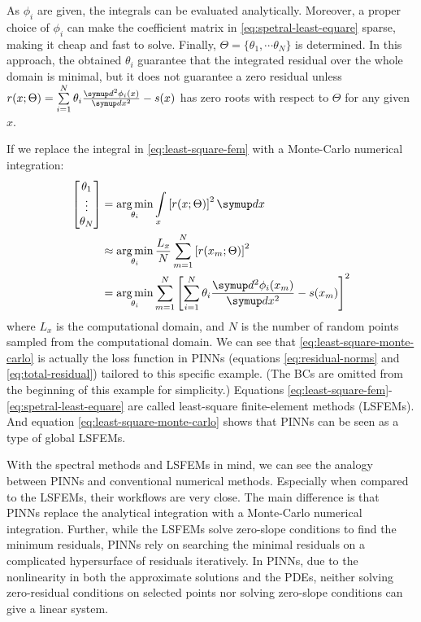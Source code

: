 As $\phi_i$ are given, the integrals can be evaluated analytically.
Moreover, a proper choice of $\phi_i$ can make the coefficient matrix in \eqref{eq:spetral-least-equare} sparse, making it cheap and fast to solve.
Finally, $\Theta=\{\theta_1,\cdots\theta_N\}$ is determined.
In this approach, the obtained $\theta_i$ guarantee that the integrated residual over the whole domain is minimal, but it does not guarantee a zero residual unless $r(x; \Theta) = \sum\limits_{i=1}^{N}\theta_i \frac{\diff^2 \phi_i(x)}{\diff x^2} - s(x)$ has zero roots with respect to $\Theta$ for any given $x$.

If we replace the integral in \eqref{eq:least-square-fem} with a Monte-Carlo numerical integration:
\begin{equation}\label{eq:least-square-monte-carlo}
    \begin{aligned}
        \begin{bmatrix}
            \theta_1 \\ \vdots \\ \theta_N
        \end{bmatrix}
        & =
        \operatorname*{arg\,min}\limits_{\theta_i}
        \int\limits_{x}\left[r(x; \Theta)\right]^2\diff x \\
        &\approx
        \operatorname*{arg\,min}\limits_{\theta_i}
        \frac{L_x}{N}\sum\limits_{m=1}^{N}\left[r(x_m; \Theta)\right]^2 \\
        & =
        \operatorname*{arg\,min}\limits_{\theta_i}
        \sum\limits_{m=1}^{N}\left[\sum\limits_{i=1}^{N}\theta_i \frac{\diff^2 \phi_i(x_m)}{\diff x^2} - s(x_m)\right]^2
    \end{aligned}
\end{equation}
where $L_x$ is the computational domain, and $N$ is the number of random points sampled from the computational domain.
We can see that \eqref{eq:least-square-monte-carlo} is actually the loss function in PINNs (equations \eqref{eq:residual-norms} and \eqref{eq:total-residual}) tailored to this specific example.
(The BCs are omitted from the beginning of this example for simplicity.)
Equations \eqref{eq:least-square-fem}-\eqref{eq:spetral-least-equare} are called least-square finite-element methods (LSFEMs).
And equation \eqref{eq:least-square-monte-carlo} shows that PINNs can be seen as a type of global LSFEMs.

With the spectral methods and LSFEMs in mind, we can see the analogy between PINNs and conventional numerical methods.
Especially when compared to the LSFEMs, their workflows are very close.
The main difference is that PINNs replace the analytical integration with a Monte-Carlo numerical integration.
Further, while the LSFEMs solve zero-slope conditions to find the minimum residuals, PINNs rely on searching the minimal residuals on a complicated hypersurface of residuals iteratively.
In PINNs, due to the nonlinearity in both the approximate solutions and the PDEs, neither solving zero-residual conditions on selected points nor solving zero-slope conditions can give a linear system. 

